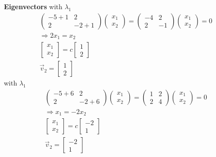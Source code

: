 \begin{myExample}
\textbf{Eigenvectors}
with $\lambda_1$
\begin{eqnarray*}
	\begin{pmatrix}
		-5+1&2\\
		2&-2+1
	\end{pmatrix}
	\begin{pmatrix}
		x_1\\x_2
	\end{pmatrix}
	=
	\begin{pmatrix}
		-4&2\\
		2&-1
	\end{pmatrix}
	\begin{pmatrix}
		x_1\\x_2
	\end{pmatrix}
	=
	0
	\\
	\Rightarrow
	2x_1=x_2
	\\
	\begin{bmatrix}
		x_1\\x_2
	\end{bmatrix}
	=c\begin{bmatrix}
		1\\2
	\end{bmatrix}
	\\\overrightarrow v_2=\begin{bmatrix}
		1\\2
	\end{bmatrix}
\end{eqnarray*}
with $\lambda_1$
\begin{eqnarray*}
	\begin{pmatrix}
		-5+6&2\\
		2&-2+6
	\end{pmatrix}
	\begin{pmatrix}
		x_1\\x_2
	\end{pmatrix}
	=
	\begin{pmatrix}
		1&2\\
		2&4
	\end{pmatrix}
	\begin{pmatrix}
		x_1\\x_2
	\end{pmatrix}
	=
	0
	\\
	\Rightarrow
	x_1=-2x_2
	\\
	\begin{bmatrix}
		x_1\\x_2
	\end{bmatrix}
	=c\begin{bmatrix}
		-2\\1
	\end{bmatrix}
	\\\overrightarrow v_2=\begin{bmatrix}
		-2\\1
	\end{bmatrix}
\end{eqnarray*}


\end{myExample}
